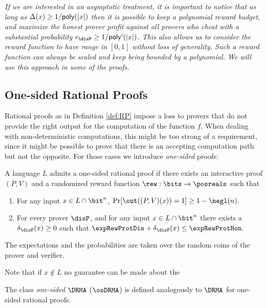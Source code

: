 
\begin{remark}
\label{rem:asy}
{\em If we are interested in an asymptotic treatment, it is important to notice that as long as $\Delta(x) \geq 1/{\sf poly}(|x|)$ then it is possible to keep a polynomial reward budget, and maximize the honest prover profit against all provers who cheat with a substantial probability $\epsilon_{\disP} \geq 1/{\sf poly'}(|x|)$. This also allows us to consider the reward function to have range in $[0,1]$ without loss of generality. Such a reward function can always be scaled and keep being bounded by a polynomial. We will use this approach in some of the proofs. }
\end{remark}




\subsection{One-sided Rational Proofs}
Rational proofs as in Definition \ref{def:RP} impose a loss to provers that do not provide the right output for the computation of the function $f$. When dealing with non-deterministic computations, this might be too strong of a requirement, since it might be possible to prove that there is an accepting computation path but not the opposite. For those cases we introduce {\em one-sided} proofs: 


\begin{definition}
	\label{def:one-sided-RP}
	A language $L$ admits a one-sided rational proof if there exists an interactive proof $(P,V)$ and a randomized reward function
	$\rew : \bits \to \posreals$ such that
	
	\begin{enumerate}
		\item For any input $x \in 
		L \cap \bit^n$, $\Pr[\out((P,V)(x)) = 1] \geq 1 - \negl(n).$
		
		\item For every prover $\disP$, and for any input $x \in 
		L \cap \bit^n$ there exists a $\delta_{\disP}(x) \geq 0$ such that 
		$ \expRewProtDis + \delta_{\disP}(x) \leq \expRewProtHon. $
	\end{enumerate}
	The expectations and the probabilities are taken over the random coins of the prover and verifier.
\end{definition}
Note that if $x \notin L$ no guarantee can be made about the 

The class \textit{one-sided} $\DRMA$ ($\osDRMA$) is defined analogously to $\DRMA$ for one-sided rational proofs.

